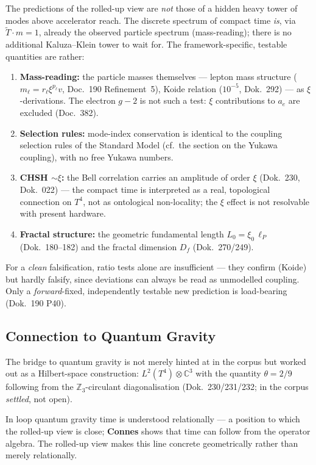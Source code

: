 The predictions of the rolled-up view are \emph{not} those of a hidden heavy tower of modes above accelerator reach. The discrete spectrum of compact time \emph{is}, via $\tilde{T}\cdot m = 1$, already the observed particle spectrum (mass-reading); there is no additional Kaluza--Klein tower to wait for. The framework-specific, testable quantities are rather:
\begin{enumerate}[leftmargin=1.6em,itemsep=0.2em]
 \item \textbf{Mass-reading:} the particle masses themselves --- lepton mass structure ($m_\ell=r_\ell\xi^{p_\ell}v$, Doc.~190 Refinement~5), Koide relation ($10^{-5}$, Dok.~292) --- as $\xi$-derivations. The electron $g-2$ is not such a test: $\xi$ contributions to $a_e$ are excluded (Doc.~382).
 \item \textbf{Selection rules:} mode-index conservation is identical to the coupling selection rules of the Standard Model (cf.\ the section on the Yukawa coupling), with no free Yukawa numbers.
 \item \textbf{CHSH $\sim \xi$:} the Bell correlation carries an amplitude of order $\xi$ (Dok.~230, Dok.~022) --- the compact time is interpreted as a real, topological connection on $T^4$, not as ontological non-locality; the $\xi$ effect is not resolvable with present hardware.
 \item \textbf{Fractal structure:} the geometric fundamental length $L_0 = \xi_0\,\ell_P$ (Dok.~180--182) and the fractal dimension $D_f$ (Dok.~270/249).
\end{enumerate}

For a \emph{clean} falsification, ratio tests alone are insufficient --- they confirm (Koide) but hardly falsify, since deviations can always be read as unmodelled coupling. Only a \emph{forward}-fixed, independently testable new prediction is load-bearing (Dok.~190 P40).

\subsection{Connection to Quantum Gravity}

The bridge to quantum gravity is not merely hinted at in the corpus but worked out as a Hilbert-space construction: $L^2(T^4)\otimes\mathbb{C}^3$ with the quantity $\theta = 2/9$ following from the $\mathbb{Z}_3$-circulant diagonalisation (Dok.~230/231/232; in the corpus \emph{settled}, not open).

In loop quantum gravity time is understood relationally --- a position to which the rolled-up view is close; \textbf{Connes} shows that time can follow from the operator algebra. The rolled-up view makes this line concrete geometrically rather than merely relationally.


